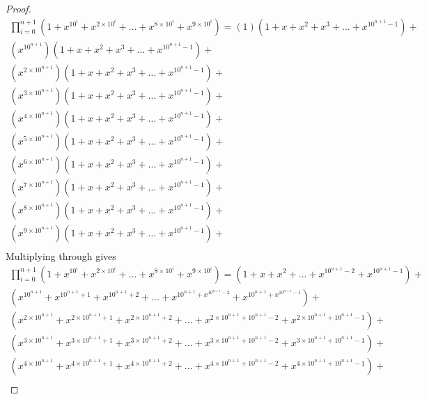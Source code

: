 \documentclass[12pt]{article}
\begin{document}
\begin{proof}
\begin{align*}
\prod_{i=0}^{n+1} \left(1 + x^{10^i} + x^{2\times10^i} + \dots + x^{8\times10^i} + x^{9\times10^i}\right) = 
                    (1)\left(1 + x + x^2 + x^3 + \dots + x^{10^{n+1}-1}\right) + \\
\left(x^{       {10^{n+1}}}\right)\left(1 + x + x^2 + x^3 + \dots + x^{10^{n+1}-1}\right) +\\
\left(x^{2\times{10^{n+1}}}\right)\left(1 + x + x^2 + x^3 + \dots + x^{10^{n+1}-1}\right) +\\
\left(x^{3\times{10^{n+1}}}\right)\left(1 + x + x^2 + x^3 + \dots + x^{10^{n+1}-1}\right) +\\
\left(x^{4\times{10^{n+1}}}\right)\left(1 + x + x^2 + x^3 + \dots + x^{10^{n+1}-1}\right) +\\
\left(x^{5\times{10^{n+1}}}\right)\left(1 + x + x^2 + x^3 + \dots + x^{10^{n+1}-1}\right) +\\
\left(x^{6\times{10^{n+1}}}\right)\left(1 + x + x^2 + x^3 + \dots + x^{10^{n+1}-1}\right) +\\
\left(x^{7\times{10^{n+1}}}\right)\left(1 + x + x^2 + x^3 + \dots + x^{10^{n+1}-1}\right) +\\
\left(x^{8\times{10^{n+1}}}\right)\left(1 + x + x^2 + x^3 + \dots + x^{10^{n+1}-1}\right) +\\
\left(x^{9\times{10^{n+1}}}\right)\left(1 + x + x^2 + x^3 + \dots + x^{10^{n+1}-1}\right) +\\
\end{align*}
Multiplying through gives 
\begin{align*}
\prod_{i=0}^{n+1} \left(1 + x^{10^i} + x^{2\times10^i} + \dots + x^{8\times10^i} + x^{9\times10^i}\right) = 
\left(1 + x + x^2 + \dots + x^{10^{n+1}-2} + x^{10^{n+1}-1}\right) + \\
\left(x^{10^{n+1}} + x^{10^{n+1}+1} + x^{10^{n+1}+2} + \dots + x^{10^{n+1} + x^{10^{n+1}-2}} + x^{10^{n+1} + x^{10^{n+1}-1}}\right) +\\
\left(x^{2\times10^{n+1}} + x^{2\times10^{n+1}+1} + x^{2\times10^{n+1}+2} + \dots + x^{2\times10^{n+1} + 10^{n+1}-2} + x^{2\times10^{n+1} + 10^{n+1}-1}\right) +\\
\left(x^{3\times10^{n+1}} + x^{3\times10^{n+1}+1} + x^{3\times10^{n+1}+2} + \dots + x^{3\times10^{n+1} + 10^{n+1}-2} + x^{3\times10^{n+1} + 10^{n+1}-1}\right) +\\
\left(x^{4\times10^{n+1}} + x^{4\times10^{n+1}+1} + x^{4\times10^{n+1}+2} + \dots + x^{4\times10^{n+1} + 10^{n+1}-2} + x^{4\times10^{n+1} + 10^{n+1}-1}\right) +\\

\end{align*}
\end{proof}
\end{document}
